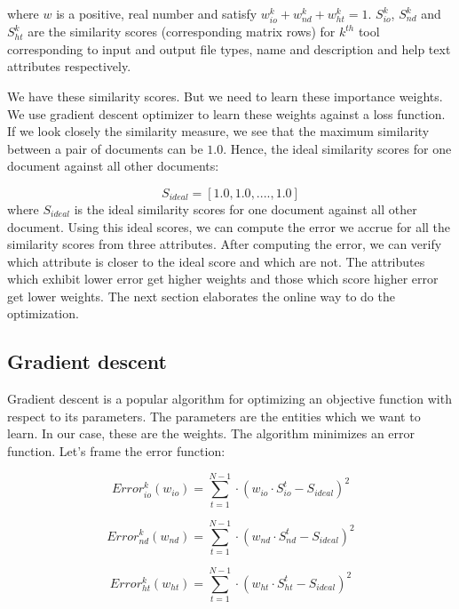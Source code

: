 where $w$ is a positive, real number and satisfy $w^k_{io} + w^k_{nd} + w^k_{ht} = 1$. 
$S^k_{io}$, $S^k_{nd}$ and $S^k_{ht}$ are the similarity scores (corresponding matrix rows) for $k^{th}$ tool corresponding to input and output file types, name and description and help text attributes respectively.

We have these similarity scores. But we need to learn these importance weights. We use gradient descent optimizer to learn these weights against a loss function. If we look closely the similarity measure, we see that the maximum similarity between a pair of documents can be $1.0$. Hence, the ideal similarity scores for one document against all other documents:

\begin{equation}
S_{ideal} = [ 1.0, 1.0, ...., 1.0 ]
\end{equation}
where $S_{ideal}$ is the ideal similarity scores for one document against all other document. Using this ideal scores, we can compute the error we accrue for all the similarity scores from three attributes. After computing the error, we can verify which attribute is closer to the ideal score and which are not. The attributes which exhibit lower error get higher weights and those which score higher error get lower weights. The next section elaborates the online way to do the optimization.


\subsection{Gradient descent}
Gradient descent is a popular algorithm for optimizing an objective function with respect to its parameters. The parameters are the entities which we want to learn. In our case, these are the weights. The algorithm minimizes an error function. Let's frame the error function:

\begin{equation}
Error^k_{io}(w_{io}) = \sum_{t=1}^{N-1} \cdot (w_{io} \cdot S^t_{io} - S_{ideal}) ^ 2
\end{equation}

\begin{equation}
Error^k_{nd}(w_{nd}) = \sum_{t=1}^{N-1} \cdot (w_{nd} \cdot S^t_{nd} - S_{ideal}) ^ 2
\end{equation}

\begin{equation}
Error^k_{ht}(w_{ht}) = \sum_{t=1}^{N-1} \cdot (w_{ht} \cdot S^t_{ht} - S_{ideal}) ^ 2
\end{equation}

